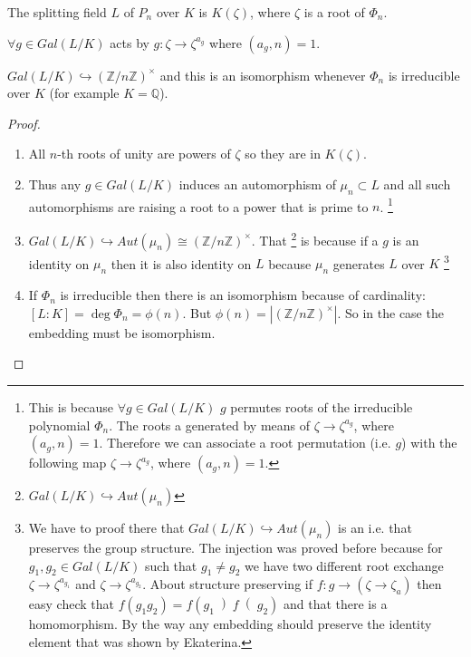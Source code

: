 \begin{theorem}
  The splitting field $L$ of $P_n$ over $K$ is $K\left(\zeta\right)$,
  where $\zeta$ is a root of $\Phi_n$.

  $\forall g \in Gal\left(L/K\right)$ acts by $g: \zeta \to
  \zeta^{a_g}$ where $\left(a_g, n\right) = 1$.

  $Gal\left(L/K\right)  \hookrightarrow
  \left(\mathbb{Z}/n\mathbb{Z}\right)^\times$ and this is an isomorphism
  whenever $\Phi_n$ is irreducible over $K$ (for example $K
  =\mathbb{Q}$). 
  \begin{proof}
    \begin{enumerate}
      \item All $n$-th roots of unity are powers of $\zeta$ so they
        are in  $K\left(\zeta\right)$.
      \item Thus any $g \in Gal\left(L/K\right)$ induces an
        automorphism of $\mu_n \subset L$ and all such automorphisms
        are raising a root to a power that is prime to $n$.
        \footnote{
          This is because $\forall g \in Gal\left(L/K\right)$
          $g$ permutes roots of the irreducible polynomial
          $\Phi_n$. The roots a generated by means of $\zeta \to
          \zeta^{a_g}$, where $\left(a_g, n\right) = 1$. Therefore
          we can associate a root permutation (i.e. $g$) with the
          following map $\zeta \to
          \zeta^{a_g}$, where $\left(a_g, n\right) = 1$.
        }
      \item $Gal\left(L/K\right)  \hookrightarrow
        Aut\left(\mu_n\right) \cong 
        \left(\mathbb{Z}/n\mathbb{Z}\right)^\times$. That
        \footnote{
          $Gal\left(L/K\right)  \hookrightarrow
          Aut\left(\mu_n\right)$
        }
        is because if a $g$ is an identity on $\mu_n$ then it is also
        identity on $L$ because $\mu_n$ generates $L$ over $K$
        \footnote{
          We have to proof there that $Gal\left(L/K\right)  \hookrightarrow
          Aut\left(\mu_n\right)$ is an 
          i.e.  that preserves the group
          structure. The injection was proved before because for
          $g_1,g_2 \in Gal\left(L/K\right)$ such that $g_1 \ne g_2$ we
          have two different root exchange $\zeta \to \zeta^{a_{g_1}}$ and
          $\zeta \to \zeta^{a_{g_2}}$. About structure preserving if
          $f: g \to \left(\zeta \to \zeta_a\right)$ then easy check
          that $f\left(g_1 g_2\right) = f\left(g_1 \left) f\right(
          g_2\right)$ and that there is a homomorphism. By the way any
          embedding should preserve the identity element that was
          shown by Ekaterina.
        }
       \item If $\Phi_n$ is irreducible then there is an isomorphism
         because of cardinality: $\left[L:K\right] = \deg \Phi_n =
         \phi\left(n\right)$. But
         $\phi\left(n\right) =
         \left|\left(\mathbb{Z}/n\mathbb{Z}\right)^\times\right|$. So in
         the case the embedding must be isomorphism. 
    \end{enumerate}    
  \end{proof}
  \label{thm:lec6_3}
\end{theorem}
